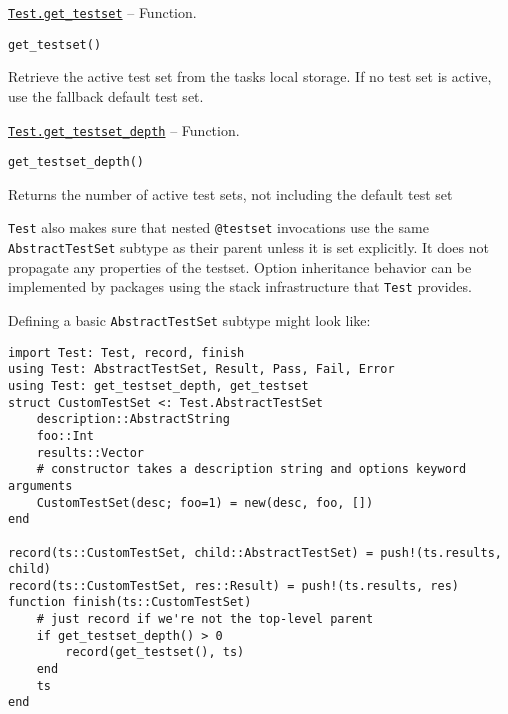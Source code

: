 \hypertarget{16535119297156519849}{}
\hyperlink{16535119297156519849}{\texttt{Test.get\_testset}}  -- {Function.}

\begin{adjustwidth}{2em}{0pt}


\begin{verbatim}
get_testset()
\end{verbatim}

Retrieve the active test set from the task{\textquotesingle}s local storage. If no test set is active, use the fallback default test set.



\end{adjustwidth}
\hypertarget{6664474132755078304}{}
\hyperlink{6664474132755078304}{\texttt{Test.get\_testset\_depth}}  -- {Function.}

\begin{adjustwidth}{2em}{0pt}


\begin{verbatim}
get_testset_depth()
\end{verbatim}

Returns the number of active test sets, not including the default test set



\end{adjustwidth}

\texttt{Test} also makes sure that nested \texttt{@testset} invocations use the same \texttt{AbstractTestSet} subtype as their parent unless it is set explicitly. It does not propagate any properties of the testset. Option inheritance behavior can be implemented by packages using the stack infrastructure that \texttt{Test} provides.



Defining a basic \texttt{AbstractTestSet} subtype might look like:




\begin{verbatim}
import Test: Test, record, finish
using Test: AbstractTestSet, Result, Pass, Fail, Error
using Test: get_testset_depth, get_testset
struct CustomTestSet <: Test.AbstractTestSet
    description::AbstractString
    foo::Int
    results::Vector
    # constructor takes a description string and options keyword arguments
    CustomTestSet(desc; foo=1) = new(desc, foo, [])
end

record(ts::CustomTestSet, child::AbstractTestSet) = push!(ts.results, child)
record(ts::CustomTestSet, res::Result) = push!(ts.results, res)
function finish(ts::CustomTestSet)
    # just record if we're not the top-level parent
    if get_testset_depth() > 0
        record(get_testset(), ts)
    end
    ts
end
\end{verbatim}



